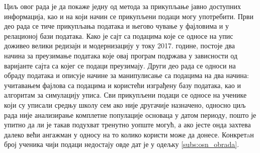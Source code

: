 Циљ овог рада је да покаже једну од метода за прикупљање јавно доступних информација, као и на који начин се прикупљени подаци могу употребити. Први део рада се тиче прикупљања података и његово чување у фајловима и у релационој бази података. Како је сајт са подацима које се односе на упис доживео велики редизајн и модернизацију у току 2017. године, постоје два начина за преузимање података које овај програм подржава у зависности од варијанте сајта са којег се подаци преузимају. Други део рада се односи на обраду података и описује начине за манипулисање са подацима на два начина: учитавањем фајлова са подацима и користећи изграђену базу података, као и алгоритам за симулацију уписа. Сви прикупљени подаци се односе на ученике који су уписали средњу школу сем ако није другачије назначено, односно циљ рада није анализирање комплетне популације основаца у датом периоду, пошто је упитно да ли је такав подухват тренутно уопште могућ, а ако јесте онда захтева далеко већи ангажман у односу на то колико користи може да донесе. Конкретaн број ученика чији подаци недостају овде дат је у одељку \ref{subs:osn_obrada}.